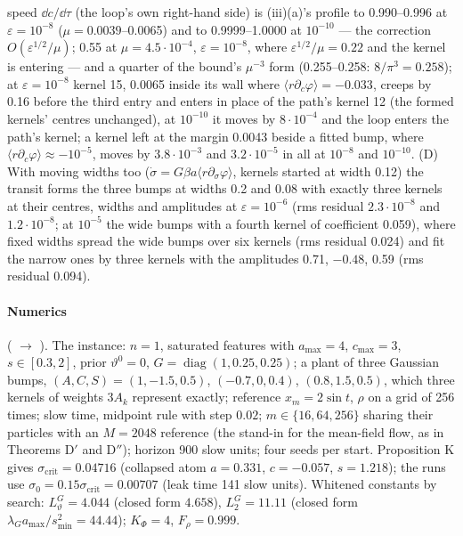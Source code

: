 \begin{sloppypar}
speed $\dd c/\dd\tau$ (the loop's own right-hand side) is (iii)(a)'s profile to 0.990--0.996 at
$\varepsilon = 10^{-8}$ ($\mu = 0.0039$--0.0065) and to 0.9999--1.0000 at $10^{-10}$ --- the correction
$O(\varepsilon^{1/2}/\mu)$; 0.55 at $\mu = 4.5\cdot10^{-4}$, $\varepsilon = 10^{-8}$, where
$\varepsilon^{1/2}/\mu = 0.22$ and the kernel is entering --- and a quarter of the bound's $\mu^{-3}$ form
(0.255--0.258: $8/\pi^3 = 0.258$); at $\varepsilon = 10^{-8}$ kernel 15, 0.0065 inside its wall where
$\langle r\partial_c\varphi\rangle = -0.033$, creeps by 0.16 before the third entry and enters in place of the path's
kernel 12 (the formed kernels' centres unchanged), at $10^{-10}$ it moves by $8\cdot10^{-4}$ and the loop enters the
path's kernel; a kernel left at the margin 0.0043 beside a fitted bump, where
$\langle r\partial_c\varphi\rangle\approx-10^{-5}$, moves by $3.8\cdot10^{-3}$ and $3.2\cdot10^{-5}$ in all at
$10^{-8}$ and $10^{-10}$. (D) With moving widths too ($\dot\sigma = G\beta a\langle r\partial_\sigma\varphi\rangle$,
kernels started at width 0.12) the transit forms the three bumps at widths 0.2 and 0.08 with exactly three kernels at
their centres, widths and amplitudes at $\varepsilon = 10^{-6}$ (rms residual $2.3\cdot10^{-8}$ and
$1.2\cdot10^{-8}$; at $10^{-5}$ the wide bumps with a fourth kernel of coefficient 0.059), where fixed widths spread the
wide bumps over six kernels (rms residual 0.024) and fit the narrow ones by three kernels with the amplitudes 0.71,
$-0.48$, 0.59 (rms residual 0.094).
\end{sloppypar}

\paragraph{Numerics} ( $\to$ ). The instance:
$n = 1$, saturated features with $a_{\max} = 4$, $c_{\max} = 3$, $s\in[0.3,2]$, prior $\vartheta^0 = 0$,
$G = \operatorname{diag}(1,0.25,0.25)$; a plant of three Gaussian bumps, $(A,C,S) = (1,-1.5,0.5)$, $(-0.7,0,0.4)$,
$(0.8,1.5,0.5)$, which three kernels of weights $3A_k$ represent exactly; reference $x_m = 2\sin t$, $\rho$ on a grid
of 256 times; slow time, midpoint rule with step $0.02$; $m\in\{16,64,256\}$ sharing their particles with an
$M = 2048$ reference (the stand-in for the mean-field flow, as in Theorems D$'$ and D$''$); horizon 900 slow units;
four seeds per start. Proposition K gives $\sigma_{\mathrm{crit}} = 0.04716$ (collapsed atom $a = 0.331$,
$c = -0.057$, $s = 1.218$); the runs use $\sigma_0 = 0.15\sigma_{\mathrm{crit}} = 0.00707$ (leak time 141 slow units).
Whitened constants by search: $L_\vartheta^G = 4.044$ (closed form $4.658$), $L_2^G = 11.11$ (closed form
$\lambda_Ga_{\max}/s_{\min}^2 = 44.44$); $K_\Phi = 4$, $F_\rho = 0.999$.

